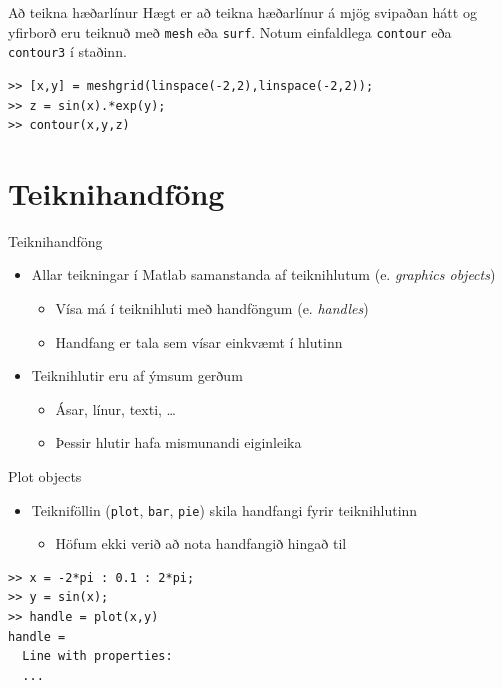 \documentclass[handout]{beamer}
\begin{document}
\begin{frame}[fragile]{Að teikna hæðarlínur}
Hægt er að teikna hæðarlínur á mjög svipaðan hátt og yfirborð eru teiknuð með \texttt{mesh} eða \texttt{surf}. Notum einfaldlega \texttt{contour} eða \texttt{contour3} í staðinn.

\begin{verbatim}
>> [x,y] = meshgrid(linspace(-2,2),linspace(-2,2));
>> z = sin(x).*exp(y);
>> contour(x,y,z)
\end{verbatim}

\end{frame}


\section{Teiknihandföng}

\begin{frame}{Teiknihandföng}
\begin{itemize}
 \item Allar teikningar í Matlab samanstanda af teiknihlutum (e. \emph{graphics objects})
 \begin{itemize}
  \item Vísa má í teiknihluti með handföngum (e. \emph{handles})
  \item Handfang er tala sem vísar einkvæmt í hlutinn
 \end{itemize}
 \item Teiknihlutir eru af ýmsum gerðum
 \begin{itemize}
  \item Ásar, línur, texti, \ldots
  \item Þessir hlutir hafa mismunandi eiginleika
 \end{itemize}
\end{itemize}
\end{frame}

\begin{frame}[fragile]{Plot objects}
\begin{itemize}
 \item Teikniföllin (\texttt{plot}, \texttt{bar}, \texttt{pie}) skila handfangi fyrir teiknihlutinn
 \begin{itemize}
  \item Höfum ekki verið að nota handfangið hingað til
 \end{itemize}
\end{itemize}
\begin{verbatim}
>> x = -2*pi : 0.1 : 2*pi;
>> y = sin(x);
>> handle = plot(x,y)
handle = 
  Line with properties:
  ...
\end{verbatim}
\end{frame}
\end{document}
